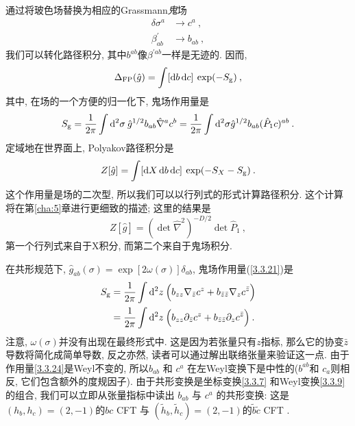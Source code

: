 通过将玻色场替换为相应的Grassmann\emph{鬼}场
\begin{subequations} \label{3.3.19}
\begin{align}
\delta \sigma^{a} &\rightarrow c^{a} \:, \label{3.3.19a}\\
\beta_{a b}^{\prime} & \rightarrow b_{a b} \:, \label{3.3.19b}
\end{align}
\end{subequations}
我们可以转化路径积分, 其中$b^{a b}$像$\beta^{\prime a b}$一样是无迹的. 因而,
\begin{equation}
\Delta_{\mathrm{FP}}(\hat{g})=\int[\mathrm{d} b\, \mathrm{d} c] \: \exp (-S_{\mathrm{g}}) \:, \label{3.3.20}
\end{equation}
其中, 在场的一个方便的归一化下, 鬼场作用量是
\begin{equation}\label{3.3.21}
S_{\mathrm{g}}=\frac{1}{2 \pi} \int \mathrm{d}^{2} \sigma \: \hat{g}^{1 / 2} b_{a b} \hat{\nabla}^{a} c^{b}=\frac{1}{2 \pi} \int \mathrm{d}^{2} \sigma \hat{g}^{1 / 2} b_{a b}(\hat{P}_{1} c)^{a b} \:. 
\end{equation}
定域地在世界面上, Polyakov路径积分是
\begin{equation}\label{3.3.22}
Z[\hat{g}]=\int[\mathrm{d} X\, \mathrm{d} b\, \mathrm{d} c]\: \exp (-S_{X}-S_{\mathrm{g}}) \:. 
\end{equation}
这个作用量是场的二次型, 所以我们可以以行列式的形式计算路径积分. 这个计算将在第\ref{cha:5}章进行更细致的描述; 这里的结果是
\begin{equation}
Z[\hat{g}]=(\operatorname{det} \hat{\nabla}^{2})^{-D / 2} \operatorname{det} \hat{P}_{1} \:, \label{3.3.23}
\end{equation}
第一个行列式来自于X积分, 而第二个来自于鬼场积分.

在共形规范下, $\hat{g}_{a b}(\sigma)=\exp [2 \omega(\sigma)] \delta_{a b}$, 鬼场作用量(\ref{3.3.21})是
\begin{align}
S_{\mathrm{g}} &=\frac{1}{2 \pi} \int \mathrm{d}^{2} z\:\Bigl(b_{z z} \nabla_{\bar{z}} c^{z}+b_{\bar{z} \bar{z}} \nabla_{z} c^{\bar{z}}\Bigr)  \nonumber \\
&=\frac{1}{2 \pi} \int \mathrm{d}^{2} z\:\Bigl(b_{z z} \partial_{\bar{z}} c^{z}+b_{\bar{z} \bar{z}} \partial_{z} c^{\bar{z}}\Bigr) \:. \label{3.3.24}
\end{align}
注意, $\omega(\sigma)$并没有出现在最终形式中.  这是因为若张量只有$z$指标, 那么它的协变$\bar{z}$导数将简化成简单导数, 反之亦然, 读者可以通过解出联络张量来验证这一点. 
由于作用量\eqref{3.3.24}是Weyl不变的, 所以$b_{a b}$ 和 $c^{a}$ 在左Weyl变换下是中性的($b^{a b}$和 $c_{a}$则相反, 它们包含额外的度规因子). 由于共形变换是坐标变换\eqref{3.3.7} 和Weyl变换\eqref{3.3.9}的组合, 我们可以立即从张量指标中读出 $b_{a b}$ 与 $c^{a}$ 的共形变换: 这是 $(h_{b}, h_{c})=(2,-1)$的$bc$ CFT 与 $(\tilde{h}_{b}, \tilde{h}_{c})=(2,-1)$的$\tilde{b} \tilde{c}$ CFT .

